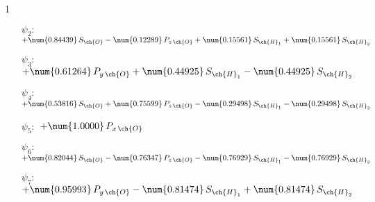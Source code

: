 \begin{questionBox}
\begin{center}
\begin{modiagram}

            \EnergyAxis[title=E, head=stealth]

        \end{modiagram}
    \end{center}
    
\end{questionBox}

\begin{questionBox}1{}
    
    \begin{itemize}
        \item[\(\psi_2:\)] %
            \(
            +   \num{0.84439}\,S_{\ch{O}}
            -   \num{0.12289}\,P_{z\,\ch{O}}
            +   \num{0.15561}\,S_{\ch{H}_1}
            +   \num{0.15561}\,S_{\ch{H}_2}
            \)
        \item[\(\psi_3:\)] %
            \(
            +   \num{0.61264}\,P_{y\,\ch{O}}
            +   \num{0.44925}\,S_{\ch{H}_1}
            -   \num{0.44925}\,S_{\ch{H}_2}
            \)
        \item[\(\psi_4:\)] %
            \(
            +   \num{0.53816}\,S_{\ch{O}}
            +   \num{0.75599}\,P_{z\,\ch{O}}
            -   \num{0.29498}\,S_{\ch{H}_1}
            -   \num{0.29498}\,S_{\ch{H}_2}
            \)
        \item[\(\psi_5:\)] %
            \(
            +   \num{1.0000}\,P_{x\,\ch{O}}
            \)
        \item[\(\psi_6:\)] %
            \(
            +   \num{0.82044}\,S_{\ch{O}}
            -   \num{0.76347}\,P_{z\,\ch{O}}
            -   \num{0.76929}\,S_{\ch{H}_1}
            -   \num{0.76929}\,S_{\ch{H}_2}
            \)
        \item[\(\psi_7:\)] %
            \(
            +   \num{0.95993}\,P_{y\,\ch{O}}
            -   \num{0.81474}\,S_{\ch{H}_1}
            +   \num{0.81474}\,S_{\ch{H}_2}
            \)
    \end{itemize}



\end{questionBox}
